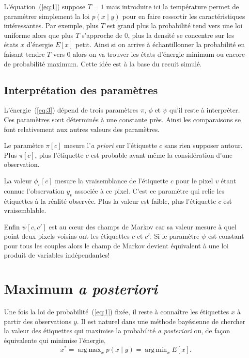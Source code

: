 \documentclass[a4paper,11pt,oneside]{article}
\DeclareMathOperator*{\argmax}{arg\,max}
\DeclareMathOperator*{\argmin}{arg\,min}
\begin{document}
L'équation~(\ref{eq:1}) suppose $T=1$ mais introduire ici la
température permet de paramétrer simplement la loi $p(x\mid
y)$ pour en faire ressortir les caractéristiques
intéressantes. Par exemple, plus $T$ est grand plus la
probabilité tend vers une loi uniforme alors que plus $T$
s'approche de $0$, plus la densité se concentre sur les
états $x$ d'énergie $E[x]$ petit. Ainsi si on arrive
à échantillonner la probabilité en faisant tendre $T$ vers
$0$ alors on va trouver les états d'énergie minimum ou
encore de probabilité maximum. Cette idée est à la base du
recuit simulé.


\subsection{Interprétation des paramètres}
\label{sec:interpretation}

L'énergie~(\ref{eq:3}) dépend de trois paramètres $\pi$,
$\phi$ et $\psi$ qu'il reste à interpréter. Ces paramètres
sont déterminés à une constante près. Ainsi les comparaisons
se font relativement aux autres valeurs des paramètres.

Le paramètre $\pi[c]$ mesure l'\emph{a priori} sur
l'étiquette $c$ sans rien supposer autour. Plus $\pi[c]$,
plus l'étiquette $c$ est probable avant même la
considération d'une observation.

La valeur $\phi_v[c]$ mesure la vraisemblance de l'étiquette
$c$ pour le pixel $v$ étant connue l'observation $y_v$
associée à ce pixel. C'est ce paramètre qui relie les
étiquettes à la réalité observée. Plus la valeur est faible,
plus l'étiquette $c$ est vraisemblable.

Enfin $\psi[c, c']$ est au cœur des champs de Markov car sa
valeur mesure à quel point deux pixels voisins ont les
étiquettes $c$ et $c'$. Si le paramètre $\psi$ est constant
pour tous les couples alors le champ de Markov devient
équivalent à une loi produit de variables indépendantes!



\section{Maximum \emph{a posteriori}}
\label{sec:maximum-posteriori}

Une fois la loi de probabilité~(\ref{eq:1}) fixée, il reste
à connaître les étiquettes $x$ à partir des observations
$y$. Il est naturel dans une méthode bayésienne de chercher
la valeur des étiquettes qui maximise la probabilité \emph{a
  posteriori} ou, de façon équivalente qui minimise
l'énergie,
\begin{equation}
  \label{eq:5}
  x^* = \argmax_x p(x\mid y) = \argmin_x E[x].
\end{equation}
\end{document}
